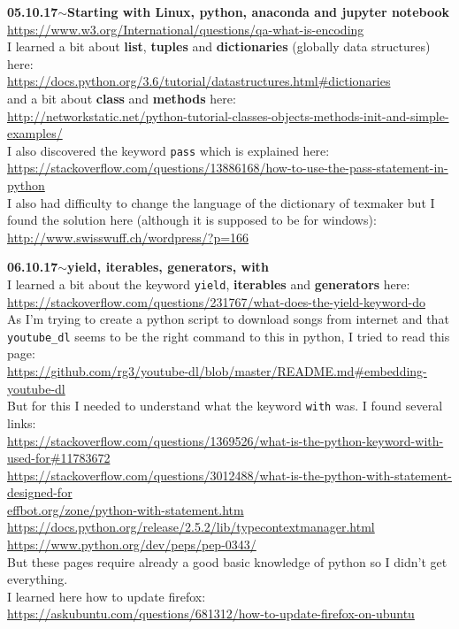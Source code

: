 \documentclass[11pt,a4paper]{article}
\newenvironment{loggentry}[2]%
{\noindent\textbf{#1}\hspace{1cm}$\mathbf{\sim}$\text{ }\textbf{#2}\\}{\vspace{0.5cm}}
\begin{document}
\begin{loggentry}{05.10.17}{Starting with Linux, python, anaconda and jupyter notebook}
\url{https://www.w3.org/International/questions/qa-what-is-encoding}\\
I learned a bit about \textbf{list}, \textbf{tuples} and \textbf{dictionaries} (globally data structures) here:\\
\url{https://docs.python.org/3.6/tutorial/datastructures.html#dictionaries}\\
and a bit about \textbf{class} and \textbf{methods} here:\\
\url{http://networkstatic.net/python-tutorial-classes-objects-methods-init-and-simple-examples/}\\
I also discovered the keyword \texttt{pass} which is explained here:\\
\url{https://stackoverflow.com/questions/13886168/how-to-use-the-pass-statement-in-python}\\
I also had difficulty to change the language of the dictionary of texmaker but I found the solution here (although it is supposed to be for windows):\\
\url{http://www.swisswuff.ch/wordpress/?p=166}\\
\end{loggentry}

\begin{loggentry}{06.10.17}{yield, iterables, generators, with}
I learned a bit about the keyword \texttt{yield}, \textbf{iterables} and \textbf{generators} here:\\
\url{https://stackoverflow.com/questions/231767/what-does-the-yield-keyword-do}\\
As I'm trying to create a python script to download songs from internet and that \texttt{youtube\_dl} seems to be the right command to this in python, I tried to read this page:\\
\url{https://github.com/rg3/youtube-dl/blob/master/README.md#embedding-youtube-dl}\\
But for this I needed to understand what the keyword \texttt{with} was. I found several links:\\
\url{https://stackoverflow.com/questions/1369526/what-is-the-python-keyword-with-used-for#11783672}\\
\url{https://stackoverflow.com/questions/3012488/what-is-the-python-with-statement-designed-for}\\
\url{effbot.org/zone/python-with-statement.htm}\\
\url{https://docs.python.org/release/2.5.2/lib/typecontextmanager.html}
\url{https://www.python.org/dev/peps/pep-0343/}\\
But these pages require already a good basic knowledge of python so I didn't get everything.\\
I learned here how to update firefox:\\
\url{https://askubuntu.com/questions/681312/how-to-update-firefox-on-ubuntu}\\
\end{loggentry}
\end{document}

